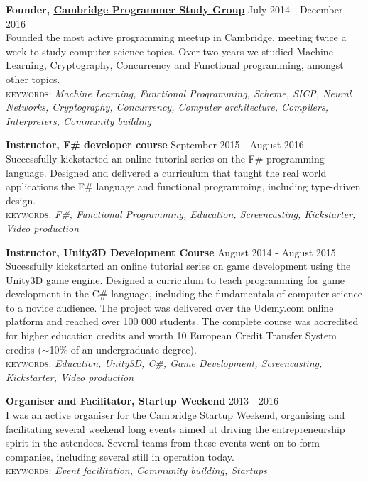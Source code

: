 \documentclass[10pt]{article}
\newcommand{\linkto}[2]{\href{#1}{\color{darkblue}\setulcolor{darkblue}\ul{#2}}}
\newcommand{\blankline}{\quad\pagebreak[2]}
\begin{document}
\blankline

\textbf{Founder, \linkto{https://www.meetup.com/Cambridge-Programmers-Study-Group/}{Cambridge Programmer Study Group}}  \hfill July 2014 - December 2016\\
Founded the most active programming meetup in Cambridge, meeting twice a week to study computer science topics. Over two years we studied Machine Learning, Cryptography, Concurrency and Functional programming, amongst other topics.\\
{\small \textsc{keywords:} \emph{Machine Learning, Functional Programming, Scheme, SICP, Neural Networks, Cryptography, Concurrency, Computer architecture, Compilers, Interpreters, Community building}}

\blankline

\textbf{Instructor, F\# developer course}  \hfill September 2015 - August 2016\\
Successfully kickstarted an online tutorial series on the F\# programming language. Designed and delivered a curriculum that taught the real world applications the F\# language and functional programming, including type-driven design.\\
{\small \textsc{keywords:} \emph{F\#, Functional Programming, Education, Screencasting, Kickstarter, Video production}}

\blankline

\textbf{Instructor, Unity3D Development Course}  \hfill August 2014 - August 2015 \\
Sucessfully kickstarted an online tutorial series on game development using the Unity3D game engine. Designed a curriculum to teach programming for game development in the C\# language, including the fundamentals of computer science to a novice audience. The project was delivered over the Udemy.com online platform and reached over 100 000 students. The complete course was accredited for higher education credits and worth 10 European Credit Transfer System credits ($\sim$10\% of an undergraduate degree).\\
{\small \textsc{keywords:} \emph{Education, Unity3D, C\#, Game Development, Screencasting, Kickstarter, Video production}}

\blankline

\textbf{Organiser and Facilitator, Startup Weekend}  \hfill 2013 - 2016\\
I was an active organiser for the Cambridge Startup Weekend, organising and facilitating several weekend long events aimed at driving the  entrepreneurship spirit in the attendees. Several teams from these events went on to form companies, including several still in operation today.\\
{\small \textsc{keywords:} \emph{Event facilitation, Community building, Startups}}
\end{document}
